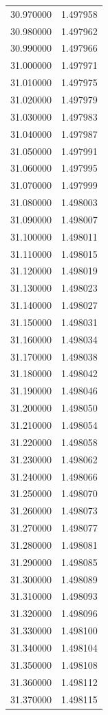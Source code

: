 \begin{tabular}{rr}
30.970000 & 1.497958 \\
30.980000 & 1.497962 \\
30.990000 & 1.497966 \\
31.000000 & 1.497971 \\
31.010000 & 1.497975 \\
31.020000 & 1.497979 \\
31.030000 & 1.497983 \\
31.040000 & 1.497987 \\
31.050000 & 1.497991 \\
31.060000 & 1.497995 \\
31.070000 & 1.497999 \\
31.080000 & 1.498003 \\
31.090000 & 1.498007 \\
31.100000 & 1.498011 \\
31.110000 & 1.498015 \\
31.120000 & 1.498019 \\
31.130000 & 1.498023 \\
31.140000 & 1.498027 \\
31.150000 & 1.498031 \\
31.160000 & 1.498034 \\
31.170000 & 1.498038 \\
31.180000 & 1.498042 \\
31.190000 & 1.498046 \\
31.200000 & 1.498050 \\
31.210000 & 1.498054 \\
31.220000 & 1.498058 \\
31.230000 & 1.498062 \\
31.240000 & 1.498066 \\
31.250000 & 1.498070 \\
31.260000 & 1.498073 \\
31.270000 & 1.498077 \\
31.280000 & 1.498081 \\
31.290000 & 1.498085 \\
31.300000 & 1.498089 \\
31.310000 & 1.498093 \\
31.320000 & 1.498096 \\
31.330000 & 1.498100 \\
31.340000 & 1.498104 \\
31.350000 & 1.498108 \\
31.360000 & 1.498112 \\
31.370000 & 1.498115 \\

\end{tabular}
